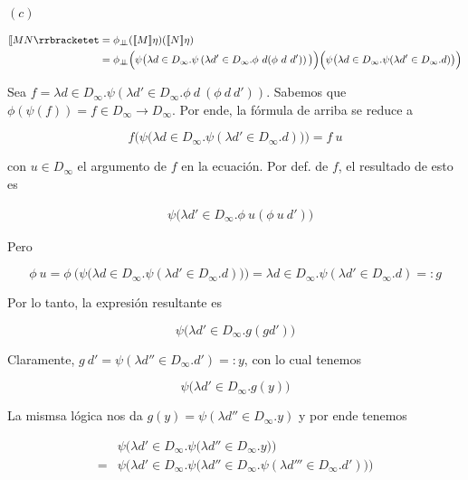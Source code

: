 \documentclass[article, 12pt]{article}
\newcommand{\ind}{\perp\!\!\!\perp}
\begin{document}
$(c)$

\begin{align*}
  \llbracket MN \rrbracketet 
  &=\phi_{\ind} ( \llbracket M \rrbracket\eta ) (\llbracket N \rrbracket \eta)
  \\ 
  &=\phi_{\ind}\Big( \psi\big( \lambda d \in  D_\infty.
  \psi \left(\lambda d' \in D_\infty. \phi ~ d (\phi ~ d ~ d') \right) \big) \Big)\Big( \psi \big(
\lambda d \in D_\infty.\psi (\lambda d' \in D_\infty.d) \big) \Big)
\end{align*}

Sea $f = \lambda d \in  D_\infty.\psi (\lambda d' \in D_\infty. \phi ~ d ~ (\phi ~
d ~ d'))$. Sabemos que $\phi (\psi (f)) = f \in  D_\infty \to D_\infty$. Por
ende, la fórmula de arriba se reduce a

\begin{equation*}
  f \Big( \psi \big( \lambda d \in D_\infty. \psi(\lambda d' \in D_\infty. d)
  \big) \Big) = f ~ u
\end{equation*}

con $u \in D_\infty$ el argumento de $f$ en la ecuación. Por def. de $f$, el
resultado de esto es

\begin{align*}
  &\psi \Big( \lambda d' \in D_\infty. \phi ~ u (\phi ~ u ~ d') \Big)
\end{align*}

Pero 

\begin{equation*}
  \phi ~ u = \phi ~ \Big( \psi \big( \lambda d \in  D_\infty.\psi(\lambda d' \in
  D_\infty.d) \big) \Big) = \lambda d \in D_\infty.\psi(\lambda d' \in
  D_\infty.d) =: g
\end{equation*}

Por lo tanto, la expresión resultante es

\begin{equation*}
  \psi \Big(  \lambda d' \in D_\infty. g (g d') \Big)
\end{equation*}


Claramente, $g ~ d' = \psi(\lambda d'' \in D_\infty.d') =: y$, con lo cual
tenemos 

\begin{equation*}
  \psi\Big( \lambda d' \in D_\infty. g(y) \Big)
\end{equation*}

La mismsa lógica nos da $g(y) = \psi(\lambda d'' \in D_\infty.y)$ y por ende
tenemos 

\begin{align*}
  &\psi\Big( \lambda d' \in D_\infty.\psi\big( \lambda d'' \in D_\infty.y \big)
  \Big)\\
  =&\psi\Big( \lambda d' \in D_\infty.\psi\big( \lambda d'' \in
  D_\infty.\psi(\lambda d''' \in D_\infty.d') \big) \Big)
\end{align*}
\end{document}
